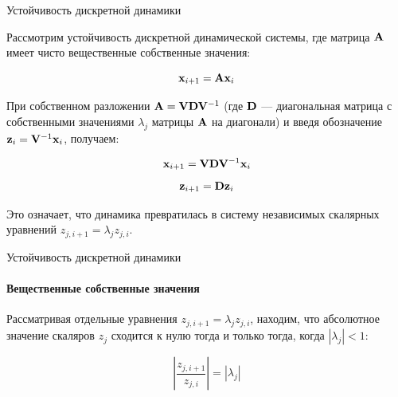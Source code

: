 \documentclass{beamer}
\begin{document}
\begin{frame}{Устойчивость дискретной динамики}
	\begin{flushleft}
		
		Рассмотрим устойчивость дискретной динамической системы, где матрица $\mathbf{A}$ имеет чисто вещественные собственные значения:
		
		\begin{equation}
			\mathbf{x}_{i+1} = \mathbf{A}\mathbf{x}_i
		\end{equation}		
		
		При собственном разложении $\mathbf{A} = \mathbf{V} \mathbf{D} \mathbf{V}^{-1}$ (где $\mathbf{D}$ — диагональная матрица с собственными значениями $\lambda_j$ матрицы $\mathbf{A}$ на диагонали) и введя обозначение $\mathbf{z}_i = \mathbf{V}^{-1}\mathbf{x}_i$, получаем:
		
		\begin{equation}
			\mathbf{x}_{i+1} = \mathbf{V} \mathbf{D} \mathbf{V}^{-1}\mathbf{x}_i
		\end{equation}
		\begin{equation}
			\mathbf{z}_{i+1} =  \mathbf{D} \mathbf{z}_i
		\end{equation}
		
		Это означает, что динамика превратилась в систему независимых скалярных уравнений $z_{j, i+1} =  \lambda_j z_{j, i}$. 
		
	\end{flushleft}
\end{frame}

\begin{frame}{Устойчивость дискретной динамики}
	\framesubtitle{Вещественные собственные значения}
	\begin{flushleft}
		
		Рассматривая отдельные уравнения $z_{j, i+1} =  \lambda_j z_{j, i}$, находим, что абсолютное значение скаляров $z_{j}$ сходится к нулю тогда и только тогда, когда $|\lambda_j| < 1$:
		
		\begin{equation}
			\left| \frac{z_{j, i+1}}{z_{j, i}} \right | =   | \lambda_j |
		\end{equation}
		
	\end{flushleft}
\end{frame}
\end{document}

